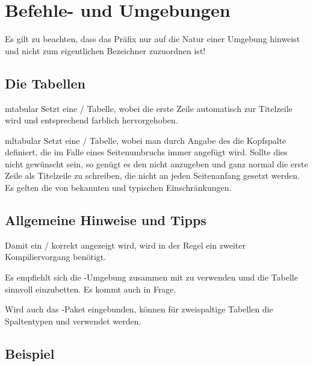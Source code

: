 \documentclass{sopra-base}
\begin{document}
\section{Befehle- und Umgebungen}

Es gilt zu beachten, dass das Präfix  nur auf die Natur einer Umgebung hinweist und nicht zum eigentlichen Bezeichner zuzuordnen ist!

\subsection{Die Tabellen}

\begin{environment}{mtabular}{}
    Setzt eine / Tabelle, wobei die erste Zeile automatisch zur Titelzeile wird und entsprechend farblich hervorgehoben. 
\end{environment}

\begin{environment}{mltabular}{}
    Setzt eine / Tabelle, wobei man durch Angabe des  die Kopfspalte definiert, die im Falle eines Seitenumbruchs immer angefügt wird. Sollte dies nicht gewünscht sein, so genügt es den  nicht anzugeben und ganz normal die erste Zeile als Titelzeile zu schreiben, 
    die nicht an jeden Seitenanfang gesetzt werden. Es gelten die von  bekannten und typischen Einschränkungen.
\end{environment}

\subsection{Allgemeine Hinweise und Tipps}

Damit ein / korrekt angezeigt wird, wird in der Regel ein zweiter Kompiliervorgang benötigt.\par{}
Es empfiehlt sich die -Umgebung zusammen mit  zu verwenden umd die Tabelle sinnvoll einzubetten. Es kommt auch  in Frage.\par{}
Wird auch das -Paket eingebunden, können für zweispaltige Tabellen die Spaltentypen  und  verwendet werden.

\subsection{Beispiel}
\end{document}
